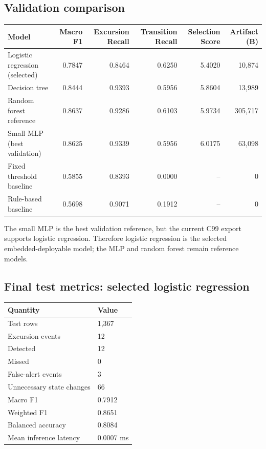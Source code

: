 \documentclass[11pt,a4paper]{article}
\begin{document}
\subsection{Validation comparison}
\begin{center}
\small
\begin{tabular}{lrrrrr}
\toprule
\textbf{Model} & \textbf{Macro F1} & \textbf{Excursion Recall} & \textbf{Transition Recall} & \textbf{Selection Score} & \textbf{Artifact (B)} \\
\midrule
\rowcolor{blue!8} Logistic regression (selected) & 0.7847 & 0.8464 & 0.6250 & 5.4020 & 10{,}874 \\
Decision tree & 0.8444 & 0.9393 & 0.5956 & 5.8604 & 13{,}989 \\
Random forest reference & 0.8637 & 0.9286 & 0.6103 & 5.9734 & 305{,}717 \\
Small MLP (best validation) & 0.8625 & 0.9339 & 0.5956 & 6.0175 & 63{,}098 \\
Fixed threshold baseline & 0.5855 & 0.8393 & 0.0000 & -- & 0 \\
Rule-based baseline & 0.5698 & 0.9071 & 0.1912 & -- & 0 \\
\bottomrule
\end{tabular}
\end{center}
The small MLP is the best validation reference, but the current C99 export
supports logistic regression. Therefore logistic regression is the selected
embedded-deployable model; the MLP and random forest remain reference models.

\subsection{Final test metrics: selected logistic regression}
\begin{center}
\begin{tabular}{ll}
\toprule
\textbf{Quantity} & \textbf{Value} \\
\midrule
Test rows & 1{,}367 \\
Excursion events & 12 \\
Detected & 12 \\
Missed & 0 \\
False-alert events & 3 \\
Unnecessary state changes & 66 \\
Macro F1 & 0.7912 \\
Weighted F1 & 0.8651 \\
Balanced accuracy & 0.8084 \\
Mean inference latency & 0.0007 ms \\
\bottomrule
\end{tabular}
\end{center}
\end{document}
